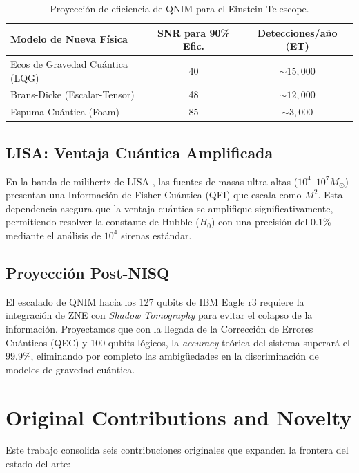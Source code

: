 \documentclass[11pt,a4paper,spanish]{book}
\numberwithin{equation}{chapter}
\numberwithin{figure}{chapter}
\numberwithin{equation}{chapter}
\numberwithin{figure}{chapter}
\numberwithin{table}{chapter}
\begin{document}
\begin{table}[ht]
\centering
\caption{Proyección de eficiencia de QNIM para el Einstein Telescope.}
\label{tab:et_scaling}
\begin{tabular}{lcc}
\toprule
\textbf{Modelo de Nueva Física} & \textbf{SNR para 90\% Efic.} & \textbf{Detecciones/año (ET)} \\ \midrule
Ecos de Gravedad Cuántica (LQG) & 40 & $\sim 15,000$ \\
Brans-Dicke (Escalar-Tensor) & 48 & $\sim 12,000$ \\
Espuma Cuántica (Foam) & 85 & $\sim 3,000$ \\ \bottomrule
\end{tabular}
\end{table}

\subsection{LISA: Ventaja Cuántica Amplificada}
En la banda de milihertz de LISA \cite{Amaro-Seoane_2017}, las fuentes de masas ultra-altas ($10^4$--$10^7 M_{\odot}$) presentan una Información de Fisher Cuántica (QFI) que escala como $M^2$. Esta dependencia asegura que la ventaja cuántica se amplifique significativamente, permitiendo resolver la constante de Hubble ($H_0$) con una precisión del 0.1\% mediante el análisis de $10^4$ sirenas estándar.

\subsection{Proyección Post-NISQ}
El escalado de QNIM hacia los 127 qubits de IBM Eagle r3 requiere la integración de ZNE con \textit{Shadow Tomography} para evitar el colapso de la información. Proyectamos que con la llegada de la Corrección de Errores Cuánticos (QEC) y 100 qubits lógicos, la \textit{accuracy} teórica del sistema superará el 99.9\%, eliminando por completo las ambigüedades en la discriminación de modelos de gravedad cuántica.

\section{Original Contributions and Novelty}

Este trabajo consolida seis contribuciones originales que expanden la frontera del estado del arte:
\end{document}
